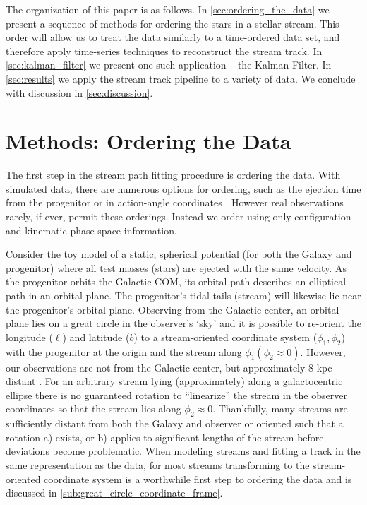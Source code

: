 \documentclass[fleqn,usenatbib]{mnras}
\begin{document}
  \vspace{5pt}

  The organization of this paper is as follows. In
  \autoref{sec:ordering_the_data} we present a sequence of methods for ordering
  the stars in a stellar stream. This order will allow us to treat the data
  similarly to a time-ordered data set, and therefore apply time-series
  techniques to reconstruct the stream track. In \autoref{sec:kalman_filter} we
  present one such application -- the Kalman Filter. In \autoref{sec:results} we
  apply the stream track pipeline to a variety of data. We conclude with
  discussion in \autoref{sec:discussion}.




\section{Methods: Ordering the Data} \label{sec:ordering_the_data}

  The first step in the stream path fitting procedure is ordering the data. With
  simulated data, there are numerous options for ordering, such as the ejection
  time from the progenitor \citep{Gibbons2014} or in action-angle coordinates
  \citep{Bovy2014}. However real observations rarely, if ever, permit these
  orderings. Instead we order using only configuration and kinematic phase-space
  information.

  Consider the toy model of a static, spherical potential (for both the Galaxy
  and progenitor) where all test masses (stars) are ejected with the same
  velocity. As the progenitor orbits the Galactic COM, its orbital path
  describes an elliptical path in an orbital plane. The progenitor's tidal tails
  (stream) will likewise lie near the progenitor's orbital plane. Observing from
  the Galactic center, an orbital plane lies on a great circle in the observer's
  `sky' and it is possible to re-orient the longitude ($\ell$) and latitude
  ($b$) to a stream-oriented coordinate system ($\phi_1, \phi_2$) with the
  progenitor at the origin and the stream along $\phi_1 (\phi_2 \approx 0)$.
  However, our observations are not from the Galactic center, but approximately
  8 kpc distant \citep[for recent measurements, see][]{GRAVITY2018, Leung2022}.
  For an arbitrary stream lying (approximately) along a galactocentric ellipse
  there is no guaranteed rotation to ``linearize'' the stream in the observer
  coordinates so that the stream lies along $\phi_2 \approx 0$. Thankfully, many
  streams are sufficiently distant from both the Galaxy and observer or oriented
  such that a rotation a) exists, or b) applies to significant lengths of the
  stream before deviations become problematic. When modeling streams and fitting
  a track in the same representation as the data, for most streams transforming
  to the stream-oriented coordinate system is a worthwhile first step to
  ordering the data and is discussed in
  \autoref{sub:great_circle_coordinate_frame}.
  
\end{document}
